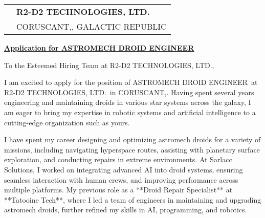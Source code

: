 \documentclass[10pt, a4paper]{article}
\begin{document}
\vspace{2.5cm}
\bigskip
\bigskip

\newcommand{\COMPANY}{R2-D2 TECHNOLOGIES, LTD.}
\newcommand{\ROLE}{ASTROMECH DROID ENGINEER}
\newcommand{\JobPostingURL}{https://www.esa.int/About_Us/Careers_at_ESA/Apply_now_to_become_an_ESA_astronaut}
\newcommand{\CITY}{CORUSCANT,}
\newcommand{\COUNTRY}{GALACTIC REPUBLIC}

\begin{tabular}{@{}p{0cm}l@{}} 
 & \textbf{\COMPANY} \\[0.8ex] 
 & \CITY, \COUNTRY
\end{tabular}

\bigskip %

\hfill {}

\noindent \textbf{\underline{Application for \href{\JobPostingURL}{\ROLE}}}

To the Esteemed Hiring Team at \COMPANY,

\bigskip

I am excited to apply for the position of \ROLE\ at \COMPANY\ in \CITY. Having spent several years engineering and maintaining droids in various star systems across the galaxy, I am eager to bring my expertise in robotic systems and artificial intelligence to a cutting-edge organization such as yours.

I have spent my career designing and optimizing astromech droids for a variety of missions, including navigating hyperspace routes, assisting with planetary surface exploration, and conducting repairs in extreme environments. At Sarlacc Solutions, I worked on integrating advanced AI into droid systems, ensuring seamless interaction with human crews, and improving performance across multiple platforms. My previous role as a **Droid Repair Specialist** at **Tatooine Tech**, where I led a team of engineers in maintaining and upgrading astromech droids, further refined my skills in AI, programming, and robotics.
\end{document}
